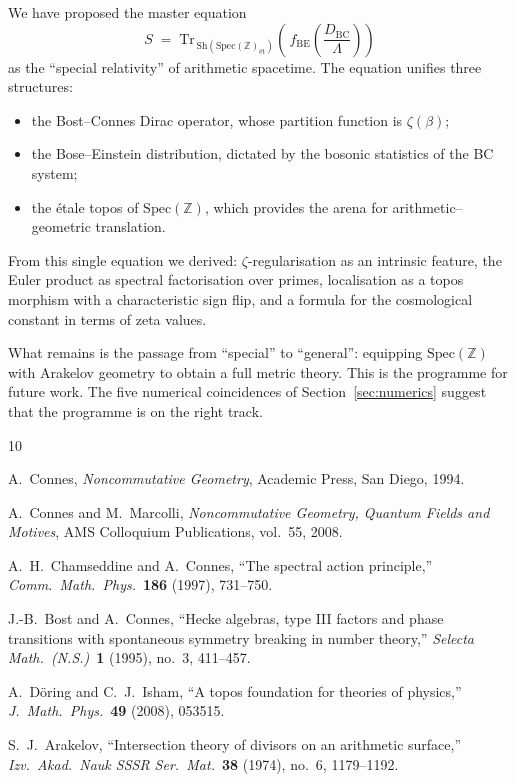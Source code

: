 \documentclass[11pt,a4paper]{article}
\begin{document}
We have proposed the master equation
\[
  S \;=\; \mathrm{Tr}_{\,\mathrm{Sh}(\mathrm{Spec}(\mathbb{Z})_{\text{\'et}})}
  \!\left(\, f_{\mathrm{BE}}\!\left(\frac{D_{\mathrm{BC}}}{\Lambda}\right)\right)
\]
as the ``special relativity'' of arithmetic spacetime. The equation unifies
three structures:
\begin{itemize}
  \item the Bost--Connes Dirac operator, whose partition function is $\zeta(\beta)$;
  \item the Bose--Einstein distribution, dictated by the bosonic statistics of the
    BC system;
  \item the \'etale topos of $\mathrm{Spec}(\mathbb{Z})$, which provides the
    arena for arithmetic--geometric translation.
\end{itemize}

From this single equation we derived: $\zeta$-regularisation as an intrinsic
feature, the Euler product as spectral factorisation over primes, localisation
as a topos morphism with a characteristic sign flip, and a formula for the
cosmological constant in terms of zeta values.

What remains is the passage from ``special'' to ``general'': equipping
$\mathrm{Spec}(\mathbb{Z})$ with Arakelov geometry to obtain a full metric
theory. This is the programme for future work. The five numerical coincidences
of Section~\ref{sec:numerics} suggest that the programme is on the right track.

\bigskip

\begin{thebibliography}{10}

A.~Connes,
\emph{Noncommutative Geometry},
Academic Press, San Diego, 1994.

A.~Connes and M.~Marcolli,
\emph{Noncommutative Geometry, Quantum Fields and Motives},
AMS Colloquium Publications, vol.~55, 2008.

A.~H.~Chamseddine and A.~Connes,
``The spectral action principle,''
\emph{Comm.\ Math.\ Phys.}\ \textbf{186} (1997), 731--750.

J.-B.~Bost and A.~Connes,
``Hecke algebras, type III factors and phase transitions with spontaneous
symmetry breaking in number theory,''
\emph{Selecta Math.\ (N.S.)}\ \textbf{1} (1995), no.~3, 411--457.

A.~D\"oring and C.~J.~Isham,
``A topos foundation for theories of physics,''
\emph{J.\ Math.\ Phys.}\ \textbf{49} (2008), 053515.

S.~J.~Arakelov,
``Intersection theory of divisors on an arithmetic surface,''
\emph{Izv.\ Akad.\ Nauk SSSR Ser.\ Mat.}\ \textbf{38} (1974), no.~6,
1179--1192.

\end{thebibliography}
\end{document}
